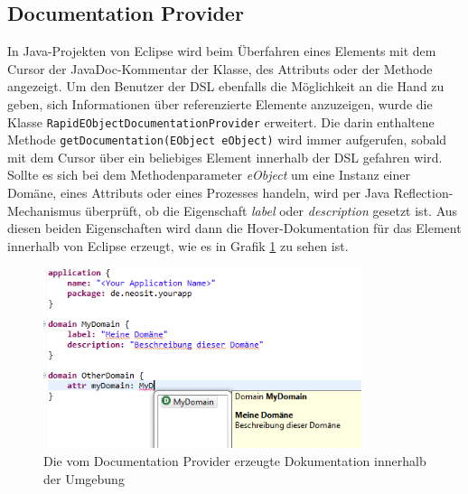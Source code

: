 \documentclass[a4paper,12pt]{scrreprt}
\begin{document}
\subsection{Documentation Provider}
In Java-Projekten von Eclipse wird beim Überfahren eines Elements mit dem Cursor der JavaDoc-Kommentar der Klasse, des Attributs oder der Methode angezeigt.
Um den Benutzer der DSL ebenfalls die Möglichkeit an die Hand zu geben, sich Informationen über referenzierte Elemente anzuzeigen, wurde die Klasse \verb+RapidEObjectDocumentationProvider+ erweitert. Die darin enthaltene Methode \verb+getDocumentation(EObject eObject)+ wird immer aufgerufen, sobald mit dem Cursor über ein beliebiges Element innerhalb der DSL gefahren wird. Sollte es sich bei dem Methodenparameter \textit{eObject} um eine Instanz einer Domäne, eines Attributs oder eines Prozesses handeln, wird per Java Reflection-Mecha\-nis\-mus überprüft, ob die Eigenschaft \textit{label} oder \textit{description} gesetzt ist. Aus diesen beiden Eigenschaften wird dann die Hover-Dokumentation für das Element innerhalb von Eclipse erzeugt, wie es in Grafik \ref{fig:documentation-provider} zu sehen ist.
\begin{figure}[h]
	\centering
		\includegraphics[height=200px]{img/documentation-provider.png}
		\caption{Die vom Documentation Provider erzeugte Dokumentation innerhalb der Umgebung}
		\label{fig:documentation-provider}
\end{figure}\\
\end{document}
